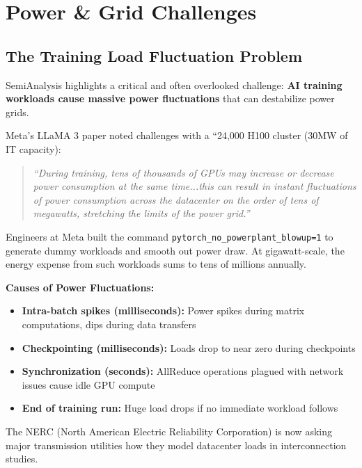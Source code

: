\documentclass[11pt,a4paper]{article}
\begin{document}
\newpage

\section{Power \& Grid Challenges}

\subsection{The Training Load Fluctuation Problem}

SemiAnalysis highlights a critical and often overlooked challenge: \textbf{AI training workloads cause massive power fluctuations} that can destabilize power grids.

Meta's LLaMA 3 paper noted challenges with a ``24,000 H100 cluster (30MW of IT capacity):
\begin{quote}
\textit{``During training, tens of thousands of GPUs may increase or decrease power consumption at the same time...this can result in instant fluctuations of power consumption across the datacenter on the order of tens of megawatts, stretching the limits of the power grid.''}
\end{quote}

Engineers at Meta built the command \texttt{pytorch\_no\_powerplant\_blowup=1} to generate dummy workloads and smooth out power draw. At gigawatt-scale, the energy expense from such workloads sums to tens of millions annually.

\textbf{Causes of Power Fluctuations:}
\begin{itemize}[leftmargin=*, itemsep=3pt]
    \item \textbf{Intra-batch spikes (milliseconds):} Power spikes during matrix computations, dips during data transfers
    \item \textbf{Checkpointing (milliseconds):} Loads drop to near zero during checkpoints
    \item \textbf{Synchronization (seconds):} AllReduce operations plagued with network issues cause idle GPU compute
    \item \textbf{End of training run:} Huge load drops if no immediate workload follows
\end{itemize}

The NERC (North American Electric Reliability Corporation) is now asking major transmission utilities how they model datacenter loads in interconnection studies.
\end{document}
